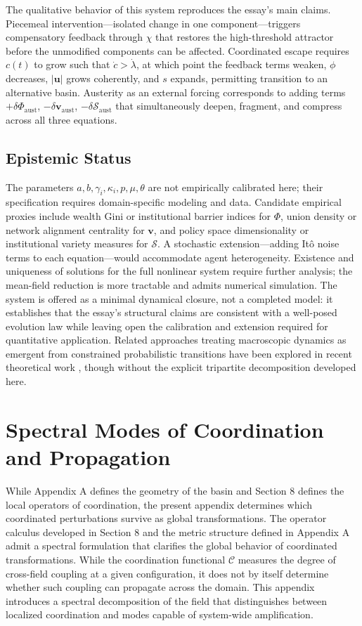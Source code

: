 \documentclass[11pt, a4paper]{article}
\begin{document}
The qualitative behavior of this system reproduces the essay's main claims. Piecemeal intervention---isolated change in one component---triggers compensatory feedback through $\chi$ that restores the high-threshold attractor before the unmodified components can be affected. Coordinated escape requires $c(t)$ to grow such that $\dot{c} > \dot{\lambda}$, at which point the feedback terms weaken, $\phi$ decreases, $|\mathbf{u}|$ grows coherently, and $s$ expands, permitting transition to an alternative basin. Austerity as an external forcing corresponds to adding terms $+\delta\Phi_{\mathrm{aust}}$, $-\delta\mathbf{v}_{\mathrm{aust}}$, $-\delta\mathcal{S}_{\mathrm{aust}}$ that simultaneously deepen, fragment, and compress across all three equations.

\subsection{Epistemic Status}

The parameters $a, b, \gamma_i, \kappa_i, p, \mu, \theta$ are not empirically calibrated here; their specification requires domain-specific modeling and data. Candidate empirical proxies include wealth Gini or institutional barrier indices for $\Phi$, union density or network alignment centrality for $\mathbf{v}$, and policy space dimensionality or institutional variety measures for $\mathcal{S}$. A stochastic extension---adding It\^{o} noise terms to each equation---would accommodate agent heterogeneity. Existence and uniqueness of solutions for the full nonlinear system require further analysis; the mean-field reduction is more tractable and admits numerical simulation. The system is offered as a minimal dynamical closure, not a completed model: it establishes that the essay's structural claims are consistent with a well-posed evolution law while leaving open the calibration and extension required for quantitative application. Related approaches treating macroscopic dynamics as emergent from constrained probabilistic transitions have been explored in recent theoretical work \cite{barandes2023}, though without the explicit tripartite decomposition developed here.


\section{Spectral Modes of Coordination and Propagation}

While Appendix A defines the geometry of the basin and Section 8 defines the local operators of coordination, the present appendix determines which coordinated perturbations survive as global transformations. The operator calculus developed in Section 8 and the metric structure defined in Appendix A admit a spectral formulation that clarifies the global behavior of coordinated transformations. While the coordination functional $\mathcal{C}$ measures the degree of cross-field coupling at a given configuration, it does not by itself determine whether such coupling can propagate across the domain. This appendix introduces a spectral decomposition of the field that distinguishes between localized coordination and modes capable of system-wide amplification.
\end{document}
